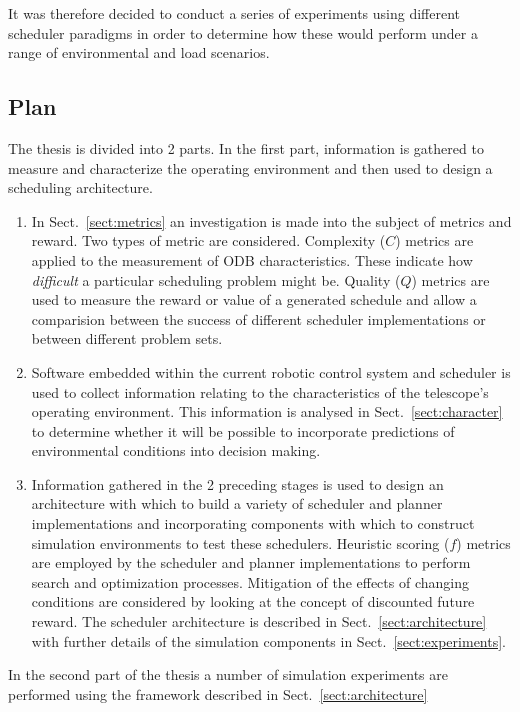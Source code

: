 It was therefore decided to conduct a series of experiments using different scheduler paradigms in order to determine how these would perform under a range of environmental and load scenarios.

\subsection{Plan}

The thesis is divided into 2 parts. In the first part, information is gathered to measure and characterize the operating environment and then used to design a scheduling architecture. 

\begin{enumerate}
\item In Sect.~\ref{sect:metrics} an investigation is made into the subject of metrics and reward. Two types of metric are considered. Complexity ($C$) metrics are applied to the measurement of ODB characteristics. These indicate how \emph{difficult} a particular scheduling problem might be. Quality ($Q$) metrics are used to measure the reward or value of a generated schedule and allow a comparision between the success of different scheduler implementations or between different problem sets. 

\item Software embedded within the current robotic control system and scheduler is used to collect information relating to the characteristics of the telescope's operating environment. This information is analysed in Sect.~\ref{sect:character} to determine whether it will be possible to incorporate predictions of environmental conditions into decision making. 

\item Information gathered in the 2 preceding stages is used to design an architecture with which to build a variety of scheduler and planner implementations and incorporating components with which to construct simulation environments to test these schedulers. Heuristic scoring ($f$) metrics are employed by the scheduler and planner implementations to perform search and optimization processes. Mitigation of the effects of changing conditions are considered by looking at the concept of discounted future reward. The scheduler architecture is described in Sect.~\ref{sect:architecture} with further details of the simulation components in Sect.~\ref{sect:experiments}.
\end{enumerate}

In the second part of the thesis a number of simulation experiments are performed using the framework described in Sect.~\ref{sect:architecture}

